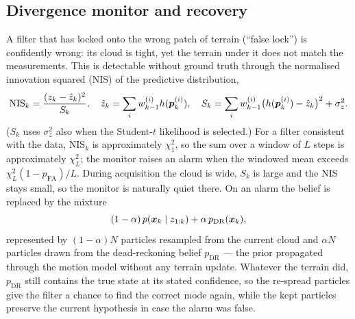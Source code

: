 \subsection{Divergence monitor and recovery}\label{sec:monitor}
A filter that has locked onto the wrong patch of terrain (``false lock'') is confidently
wrong: its cloud is tight, yet the terrain under it does not match the measurements. This is
detectable without ground truth through the normalised innovation squared (NIS) of the
predictive distribution,
\begin{equation}
  \mathrm{NIS}_k = \frac{(z_k - \hat z_k)^2}{S_k},\quad
  \hat z_k = \sum_i w_{k-1}^{(i)} h(\bm{p}_k^{(i)}),\quad
  S_k = \sum_i w_{k-1}^{(i)} \bigl(h(\bm{p}_k^{(i)}) - \hat z_k\bigr)^2 + \sigma_z^2 .
\end{equation}
($S_k$ uses $\sigma_z^2$ also when the Student-$t$ likelihood is selected.) For a filter
consistent with the data, $\mathrm{NIS}_k$ is approximately $\chi^2_1$, so the sum
over a window of $L$ steps is approximately $\chi^2_L$; the monitor raises an alarm when the
windowed mean exceeds $\chi^2_L(1 - p_{\mathrm{FA}})/L$. During acquisition the cloud is wide,
$S_k$ is large and the NIS stays small, so the monitor is naturally quiet there. On an alarm the
belief is replaced by the mixture
\begin{equation}
  (1-\alpha)\, p(\bm{x}_k \mid z_{1:k}) + \alpha\, p_{\mathrm{DR}}(\bm{x}_k),
\end{equation}
represented by $(1-\alpha)N$ particles resampled from the current cloud and $\alpha N$ particles
drawn from the dead-reckoning belief $p_{\mathrm{DR}}$ --- the prior propagated through the
motion model without any terrain update. Whatever the terrain did, $p_{\mathrm{DR}}$ still
contains the true state at its stated confidence, so the re-spread particles give the filter a
chance to find the correct mode again, while the kept particles preserve the current hypothesis
in case the alarm was false.

